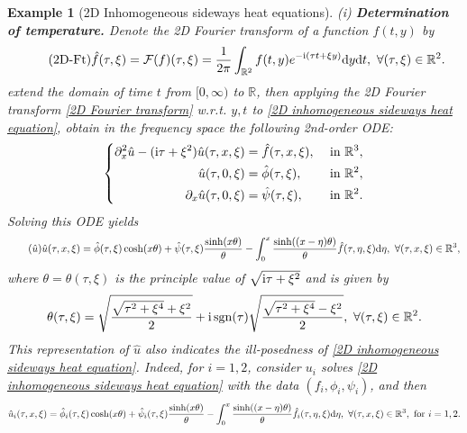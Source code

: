 \documentclass[oneside,11pt]{book}
\numberwithin{equation}{section}
\newtheorem{example}{Example}[section]
\begin{document}
\begin{example}[2D Inhomogeneous sideways heat equations]
    \noindent(i) \textbf{Determination of temperature.} Denote the 2D Fourier transform of a function $f(t,y)$ by
    \begin{align}
        \label{2D Fourier transform}
        \tag{2D-Ft}
        \hat{f}(\tau,\xi) = \mathcal{F}(f)(\tau,\xi) = \frac{1}{2\pi}\int_{\mathbb{R}^2} f(t,y)e^{-{\rm i}(\tau t + \xi y)}{\rm d}y{\rm d}t,\ \forall(\tau,\xi)\in\mathbb{R}^2.
    \end{align}
    extend the domain of time $t$ from $[0,\infty)$ to $\mathbb{R}$, then applying the 2D Fourier transform \eqref{2D Fourier transform} w.r.t. $y,t$ to \eqref{2D inhomogeneous sideways heat equation}, obtain in the frequency space the following 2nd-order ODE:
    \begin{equation*}
        \left\{\begin{split}
            \partial_x^2\hat{u} - ({\rm i}\tau + \xi^2)\hat{u}(\tau,x,\xi) &= \hat{f}(\tau,x,\xi), &&\mbox{ in } \mathbb{R}^3,\\
            \hat{u}(\tau,0,\xi) &= \hat{\phi}(\tau,\xi), &&\mbox{ in } \mathbb{R}^2,\\
            \partial_x\hat{u}(\tau,0,\xi) &= \hat{\psi}(\tau,\xi), &&\mbox{ in } \mathbb{R}^2.
        \end{split}\right.
    \end{equation*}
    Solving this ODE yields
    \begin{align}
        \label{Fourier transform of solution of 2D inhomogeneous sideways heat equation}
        \tag{$\hat{u}$}
        \hat{u}(\tau,x,\xi) = \hat{\phi}(\tau,\xi)\cosh(x\theta) + \hat{\psi}(\tau,\xi)\frac{\sinh(x\theta)}{\theta} - \int_0^x \frac{\sinh((x - \eta)\theta)}{\theta}\hat{f}(\tau,\eta,\xi){\rm d}\eta,\ \forall(\tau,x,\xi)\in\mathbb{R}^3,
    \end{align}
    where $\theta = \theta(\tau,\xi)$ is the principle value of $\sqrt{{\rm i}\tau + \xi^2}$ and is given by
    \begin{align*}
        \theta(\tau,\xi) = \sqrt{\frac{\sqrt{\tau^2 + \xi^4} + \xi^2}{2}} + {\rm i}\operatorname{sgn}(\tau)\sqrt{\frac{\sqrt{\tau^2 + \xi^4} - \xi^2}{2}},\ \forall(\tau,\xi)\in\mathbb{R}^2.
    \end{align*}
    This representation of $\hat{u}$ also indicates the ill-posedness of \eqref{2D inhomogeneous sideways heat equation}. Indeed, for $i = 1,2$, consider $u_i$ solves \eqref{2D inhomogeneous sideways heat equation} with the data $(f_i,\phi_i,\psi_i)$, and then
    \begin{align*}
        \hat{u}_i(\tau,x,\xi) = \hat{\phi}_i(\tau,\xi)\cosh(x\theta) + \hat{\psi}_i(\tau,\xi)\frac{\sinh(x\theta)}{\theta} - \int_0^x \frac{\sinh((x - \eta)\theta)}{\theta}\hat{f}_i(\tau,\eta,\xi){\rm d}\eta,\ \forall(\tau,x,\xi)\in\mathbb{R}^3, \mbox{ for } i = 1,2.

\end{align*}
\end{example}
\end{document}
